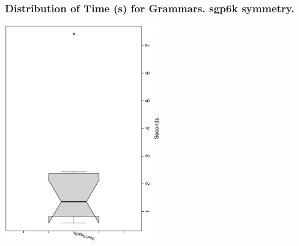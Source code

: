  \begin{frame}
 \frametitle{ Distribution of Time (s) for Grammars. sgp6k  symmetry. }
 \begin{center}
\includegraphics[width=0.5\textwidth, angle=-90]
{ExpFboxplottSeconds004.eps}
 \end{center}
 \label{ExpFboxplottSeconds004.eps}  
 \end{frame}

